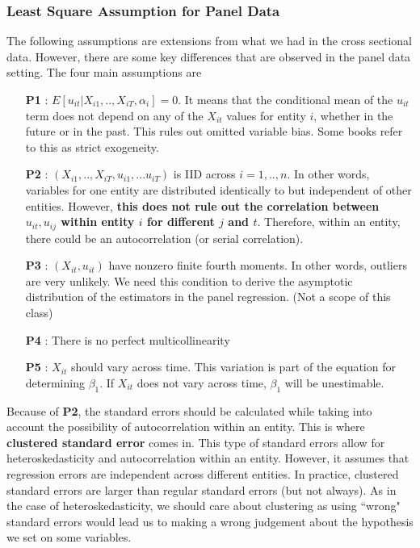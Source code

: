 \documentclass[12pt]{article}
\theoremstyle{definition}
\theoremstyle{property}
\theoremstyle{assumption}
\theoremstyle{example}
\theoremstyle{comment}
\begin{document}
\subsubsection{Least Square Assumption for Panel Data}
The following assumptions are extensions from what we had in the cross sectional data. However, there are some key differences that are observed in the panel data setting. The four main assumptions are
\begin{itemize}
\item [\textbf{P1}]: $E[u_{it}|X_{i1},..,X_{iT},\alpha_i]=0$. It means that the conditional mean of the $u_{it}$ term does not depend on any of the $X_{it}$ values for entity $i$, whether in the future or in the past. This rules out omitted variable bias. Some books refer to this as strict exogeneity. 
\item [\textbf{P2}]: $(X_{i1},..,X_{iT},u_{i1},...u_{iT})$ is IID across $i=1,..,n$. In other words, variables for one entity are distributed identically to but independent of other entities. However, \textbf{this does not rule out the correlation between $u_{it},u_{ij}$ within entity $i$ for different $j$ and $t$}. Therefore, within an entity, there could be an autocorrelation (or serial correlation).  
\item [\textbf{P3}]: $(X_{it},u_{it})$ have nonzero finite fourth moments. In other words, outliers are very unlikely. We need this condition to derive the asymptotic distribution of the estimators in the panel regression. (Not a scope of this class)
\item [\textbf{P4}]: There is no perfect multicollinearity
\item [\textbf{P5}]: $X_{it}$ should vary across time. This variation is part of the equation for determining $\beta_1$. If $X_{it}$ does not vary across time, $\beta_1$ will be unestimable. 
\end{itemize}
Because of \textbf{P2}, the standard errors should be calculated while taking into account the possibility of autocorrelation within an entity. This is where \textbf{clustered standard error} comes in. This type of standard errors allow for heteroskedasticity and autocorrelation within an entity. However, it assumes that regression errors are independent across different entities. In practice, clustered standard errors are larger than regular standard errors (but not always). As in the case of heteroskedasticity, we should care about clustering as using ``wrong" standard errors would lead us to making a wrong judgement about the hypothesis we set on some variables. \par\medskip


\end{document}
